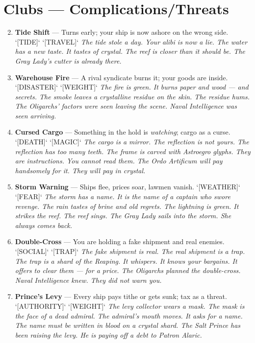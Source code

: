 \section*{Clubs --- Complications/Threats}
\label{sec:zakov-complications}
\begin{enumerate}
\setcounter{enumi}{1}
\item \textbf{Tide Shift} --- Turns early; your ship is now ashore on the wrong side. `[TIDE]` `[TRAVEL]`
  \hfill \textit{The tide stole a day. Your alibi is now a lie. The water has a new taste. It tastes of crystal. The reef is closer than it should be. The Gray Lady's cutter is already there.}
\item \textbf{Warehouse Fire} --- A rival syndicate burns it; your goods are inside. `[DISASTER]` `[WEIGHT]`
  \hfill \textit{The fire is green. It burns paper and wood --- and secrets. The smoke leaves a crystalline residue on the skin. The residue hums. The Oligarchs' factors were seen leaving the scene. Naval Intelligence was seen arriving.}
\item \textbf{Cursed Cargo} --- Something in the hold is \textit{watching}; cargo as a curse. `[DEATH]` `[MAGIC]`
  \hfill \textit{The cargo is a mirror. The reflection is not yours. The reflection has too many teeth. The frame is carved with Astroegro glyphs. They are instructions. You cannot read them. The Ordo Artificum will pay handsomely for it. They will pay in crystal.}
\item \textbf{Storm Warning} --- Ships flee, prices soar, lawmen vanish. `[WEATHER]` `[FEAR]`
  \hfill \textit{The storm has a name. It is the name of a captain who swore revenge. The rain tastes of brine and old regrets. The lightning is green. It strikes the reef. The reef sings. The Gray Lady sails into the storm. She always comes back.}
\item \textbf{Double-Cross} --- You are holding a fake shipment and real enemies. `[SOCIAL]` `[TRAP]`
  \hfill \textit{The fake shipment is real. The real shipment is a trap. The trap is a shard of the Reaping. It whispers. It knows your bargains. It offers to clear them --- for a price. The Oligarchs planned the double-cross. Naval Intelligence knew. They did not warn you.}
\item \textbf{Prince's Levy} --- Every ship pays tithe or gets sunk; tax as a threat. `[AUTHORITY]` `[WEIGHT]`
  \hfill \textit{The levy collector wears a mask. The mask is the face of a dead admiral. The admiral's mouth moves. It asks for a name. The name must be written in blood on a crystal shard. The Salt Prince has been raising the levy. He is paying off a debt to Patron Alaric.}

\end{enumerate}
